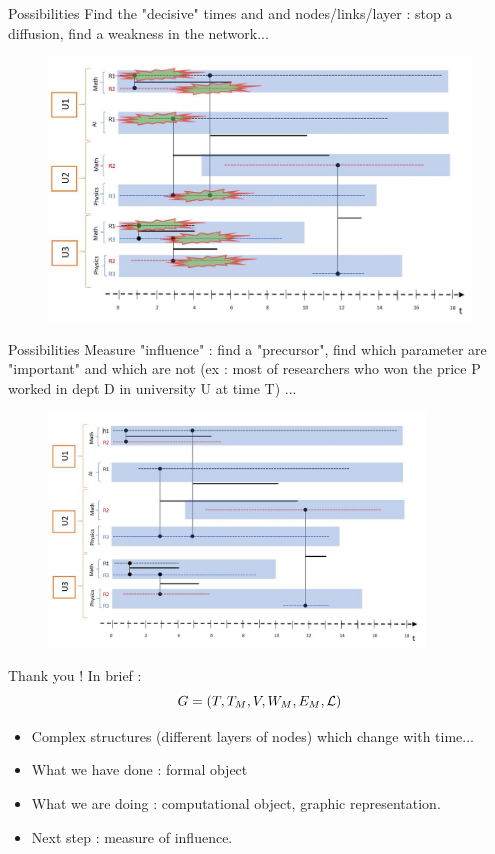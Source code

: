 \documentclass[15pt]{beamer}
\begin{document}
\begin{frame}{Possibilities} %
Find the "decisive" times and and nodes/links/layer : stop a diffusion, find a weakness in the network...
\begin{figure}
	\centering
    \includegraphics[width=\linewidth]{img/epidemiet1.jpg}
    \label{fig:chercheurs}	
\end{figure}
\end{frame}


\begin{frame}{Possibilities}%
	Measure "influence" : find a "precursor", find which parameter are "important" and which are not (ex : most of researchers who won the price P worked in dept D in university U at time T) ...
	\begin{figure}
		\centering
		\includegraphics[width=10cm]{img/chercheurs.jpg}
		\label{influ}
	\end{figure}
\end{frame}



\begin{frame}{Thank you !}
	In brief :
	\[
		G=(T,T_M,V,W_M,E_M,\cal{L})
	\]
	\begin{itemize}
		\item Complex structures (different layers of nodes) which change with time...
		\item What we have done : formal object
		\item What we are doing : computational object, graphic representation.
		\item Next step : measure of influence.
	\end{itemize}
	
\end{frame}
\end{document}
